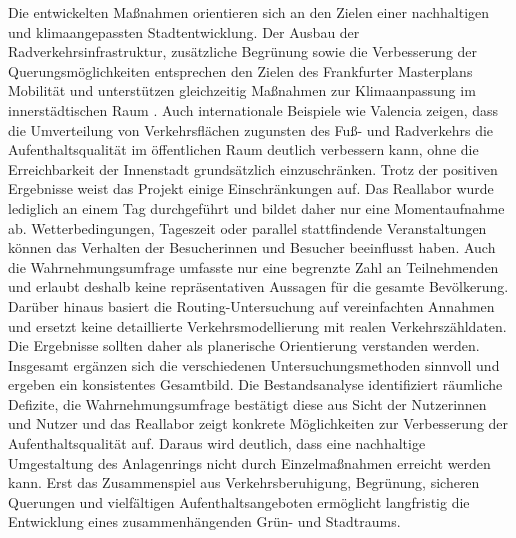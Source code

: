 \documentclass[a4paper,12pt]{article}
\begin{document}
Die entwickelten Maßnahmen orientieren sich an den Zielen einer nachhaltigen und klimaangepassten Stadtentwicklung. Der Ausbau der Radverkehrsinfrastruktur, zusätzliche Begrünung sowie die Verbesserung der Querungsmöglichkeiten entsprechen den Zielen des Frankfurter Masterplans Mobilität und unterstützen gleichzeitig Maßnahmen zur Klimaanpassung im innerstädtischen Raum \autocite{stadtfrankfurtmasterplan2025,umweltbundesamt2022}. Auch internationale Beispiele wie Valencia zeigen, dass die Umverteilung von Verkehrsflächen zugunsten des Fuß- und Radverkehrs die Aufenthaltsqualität im öffentlichen Raum deutlich verbessern kann, ohne die Erreichbarkeit der Innenstadt grundsätzlich einzuschränken.
Trotz der positiven Ergebnisse weist das Projekt einige Einschränkungen auf. Das Reallabor wurde lediglich an einem Tag durchgeführt und bildet daher nur eine Momentaufnahme ab. Wetterbedingungen, Tageszeit oder parallel stattfindende Veranstaltungen können das Verhalten der Besucherinnen und Besucher beeinflusst haben. Auch die Wahrnehmungsumfrage umfasste nur eine begrenzte Zahl an Teilnehmenden und erlaubt deshalb keine repräsentativen Aussagen für die gesamte Bevölkerung. Darüber hinaus basiert die Routing-Untersuchung auf vereinfachten Annahmen und ersetzt keine detaillierte Verkehrsmodellierung mit realen Verkehrszähldaten. Die Ergebnisse sollten daher als planerische Orientierung verstanden werden.
Insgesamt ergänzen sich die verschiedenen Untersuchungsmethoden sinnvoll und ergeben ein konsistentes Gesamtbild. Die Bestandsanalyse identifiziert räumliche Defizite, die Wahrnehmungsumfrage bestätigt diese aus Sicht der Nutzerinnen und Nutzer und das Reallabor zeigt konkrete Möglichkeiten zur Verbesserung der Aufenthaltsqualität auf. Daraus wird deutlich, dass eine nachhaltige Umgestaltung des Anlagenrings nicht durch Einzelmaßnahmen erreicht werden kann. Erst das Zusammenspiel aus Verkehrsberuhigung, Begrünung, sicheren Querungen und vielfältigen Aufenthaltsangeboten ermöglicht langfristig die Entwicklung eines zusammenhängenden Grün- und Stadtraums.
\end{document}
